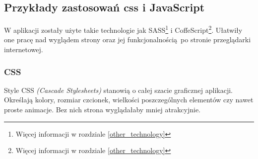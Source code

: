     

    \subsection{Przykłady zastosowań css i JavaScript}
      W aplikacji zostały użyte takie technologie jak SASS\footnote{Więcej informacji w rozdziale \ref{other_technology}} i CoffeScript\footnote{Więcej informacji w rozdziale \ref{other_technology}}. Ułatwiły one pracę nad wyglądem strony oraz jej funkcjonalnością po stronie przeglądarki internetowej.\\

      \subsubsection{CSS}
        Style CSS \emph{(Cascade Stylesheets)} stanowią o całej szacie graficznej aplikacji. Określają kolory, rozmiar czcionek, wielkości poszczególnych elementów czy nawet proste animacje. Bez nich strona wyglądałaby mniej atrakcyjnie.
